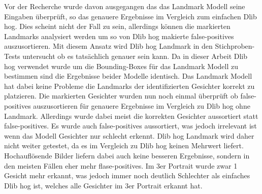 Vor der Recherche wurde davon ausgegangen das das Landmark Modell seine Eingaben überprüft, so das genauere Ergebnisse im Vergleich zum einfachen Dlib \gls{hog}. Dies scheint nicht der Fall zu sein, allerdings können die markierten Landmarks analysiert werden um so von Dlib \gls{hog} makierte false-positives auszusortieren. Mit diesem Ansatz wird Dlib \gls{hog} Landmark in den Stichproben-Tests untersucht ob es tatsächlich genauer sein kann.
Da in dieser Arbeit Dlib \gls{hog} verwendet wurde um die Bounding-Boxes für das Landmark Modell zu bestimmen sind die Ergebnisse beider Modelle identisch. Das Landmark Modell hat dabei keine Probleme die Landmarks der identifizierten Gesichter korrekt zu platzieren. Die markierten Gesichter wurden nun noch einmal überprüft ob false-positives auszusortieren für genauere Ergebnisse im Vergleich zu Dlib \gls{hog} ohne Landmark. Allerdings wurde dabei meist die korrekten Gesichter aussortiert statt false-positives. Es wurde auch false-positives aussortiert, was jedoch irrelevant ist wenn das Modell Gesichter nur schlecht erkennt. Dlib \gls{hog} Landmark wird daher nicht weiter getestet, da es im Vergleich zu Dlib \gls{hog} keinen Mehrwert liefert. Hochauflösende Bilder liefern dabei auch keine besseren Ergebnisse, sondern in den meisten Fällen eher mehr flase-positives. Im 3er Portrait wurde zwar 1 Gesicht mehr erkannt, was jedoch immer noch deutlich Schlechter als einfaches Dlib \gls{hog} ist, welches alle Gesichter im 3er Portrait erkannt hat.


